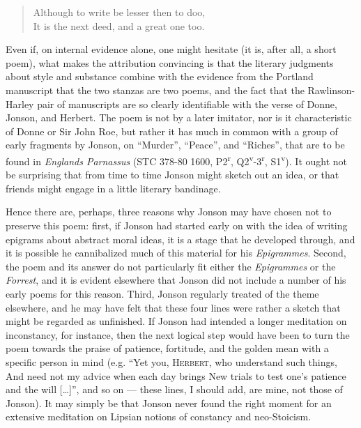 \begin{paper}
\begin{quote}
Although to write be lesser then to doo, \\
It is the next deed, and a great one too.      
\end{quote}

\noindent Even if, on internal evidence alone, one might hesitate (it is, after
all, a short poem), what makes the attribution convincing is that the
literary judgments about style and substance combine with the evidence
from the Portland manuscript that the two stanzas are two poems, and the
fact that the Rawlinson-Harley pair of manuscripts are so clearly
identifiable with the verse of Donne, Jonson, and Herbert. The poem is
not by a later imitator, nor is it characteristic of Donne or Sir John
Roe, but rather it has much in common with a group of early fragments by
Jonson, on ``Murder'', ``Peace'', and ``Riches'', that are to be found in
\emph{Englands Parnassus} (STC 378-80 1600, P2\textsuperscript{r},
Q2\textsuperscript{v}-3\textsuperscript{r}, S1\textsuperscript{v}). It
ought not be surprising that from time to time Jonson might sketch out
an idea, or that friends might engage in a little literary bandinage.

Hence there are, perhaps, three reasons why Jonson may have chosen not
to preserve this poem: first, if Jonson had started early on with the
idea of writing epigrams about abstract moral ideas, it is a stage that
he developed through, and it is possible he cannibalized much of this
material for his \emph{Epigrammes}. Second, the poem and its answer do
not particularly fit either the \emph{Epigrammes} or the \emph{Forrest},
and it is evident elsewhere that Jonson did not include a number of his
early poems for this reason. Third, Jonson regularly treated of the
theme elsewhere, and he may have felt that these four lines were rather
a sketch that might be regarded as unfinished. If Jonson had intended a
longer meditation on inconstancy, for instance, then the next logical
step would have been to turn the poem towards the praise of patience,
fortitude, and the golden mean with a specific person in mind (e.g. ``Yet
you, H\textsc{erbert}, who understand such things, \textbar{} And need
not my advice when each day brings \textbar{} New trials to test one's
patience and the will {[}\ldots{}{]}'', and so on --- these lines, I should add,
are mine, not those of Jonson). It may simply be that Jonson never found
the right moment for an extensive meditation on Lipsian notions of
constancy and neo-Stoicism.


\end{paper}

